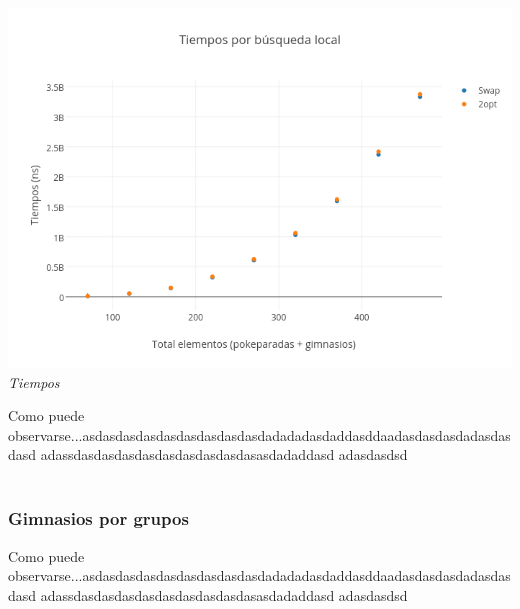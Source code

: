    \vspace*{0.3cm} \vspace*{0.3cm}
  \begin{center}
	\includegraphics[scale=0.40]{./EJ3/tiemposLocales470.png}
	\label{fig:randomTiempos2}	
	\\{\textit{Tiempos}}
  \end{center}
  \vspace*{0.3cm} 

Como puede observarse...asdasdasdasdasdasdasdasdasdadadadasdaddasddaadasdasdasdadasdasdasd
adassdasdasdasdasdasdasdasdasdasasdadaddasd
adasdasdsd  
\\\\
 
\newpage
\subsubsection*{Gimnasios por grupos}

Como puede observarse...asdasdasdasdasdasdasdasdasdadadadasdaddasddaadasdasdasdadasdasdasd
adassdasdasdasdasdasdasdasdasdasasdadaddasd
adasdasdsd
\\\\

